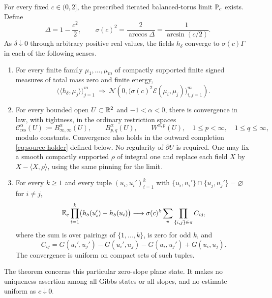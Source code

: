 \begin{theorem}\label{thm:main}
For every fixed \(c\in(0,2]\), the prescribed iterated balanced-torus limit
\(\P_c\) exists. Define
\begin{equation}\label{eq:multiplier}
 \Delta=1-\frac{c^2}{2},\qquad
 \sigma(c)^2=\frac2{\arccos\Delta}=\frac1{\arcsin(c/2)}.
\end{equation}
As \(\delta\downarrow0\) through arbitrary positive real values,
the fields \(h_\delta\) converge to
\(\sigma(c)\Gamma\) in each of the following senses.
\begin{enumerate}
\item For every finite family \(\mu_1,\ldots,\mu_m\) of compactly supported
finite signed measures of total mass zero and finite energy,
\[
 \bigl(\langle h_\delta,\mu_j\rangle\bigr)_{j=1}^m
 \ \Longrightarrow\
 \mathcal N\!\left(0,
       \bigl(\sigma(c)^2\mathcal E(\mu_i,\mu_j)\bigr)_{i,j=1}^m\right).
\]
\item For every bounded open \(U\subset\R^2\) and \(-1<\alpha<0\),
there is convergence in law, with tightness, in the ordinary restriction
spaces
\[
 \mathcal C^\alpha_{\mathrm{res}}(U):=B^\alpha_{\infty,\infty}(U),
 \qquad B^\alpha_{p,q}(U),\qquad W^{\alpha,p}(U),
 \quad 1\le p<\infty,\quad 1\le q\le\infty,
\]
modulo constants. Convergence also holds in the outward completion
\eqref{eq:source-holder} defined below. No regularity of
\(\partial U\) is required. One may fix a smooth compactly supported
\(\rho\) of integral one and replace each field \(X\) by
\(X-\langle X,\rho\rangle\), using the same pinning for the limit.
\item For every \(k\ge1\) and every tuple
\((u_i,u_i')_{i=1}^k\) with
\(\{u_i,u_i'\}\cap\{u_j,u_j'\}=\varnothing\) for \(i\ne j\),
\begin{equation}\label{eq:increment-main}
 \E_c\prod_{i=1}^k
    \bigl(h_\delta(u_i')-h_\delta(u_i)\bigr)
 \longrightarrow
 \sigma(c)^k\sum_{\pi}\prod_{\{i,j\}\in\pi}C_{ij},
\end{equation}
where the sum is over pairings of \(\{1,\ldots,k\}\), is zero for odd \(k\),
and
\[
 C_{ij}=G(u_i',u_j')-G(u_i',u_j)-G(u_i,u_j')+G(u_i,u_j).
\]
The convergence is uniform on compact sets of such tuples.
\end{enumerate}
\end{theorem}

The theorem concerns this particular zero-slope plane state. It makes no
uniqueness assertion among all Gibbs states or all slopes, and no estimate
uniform as \(c\downarrow0\).

